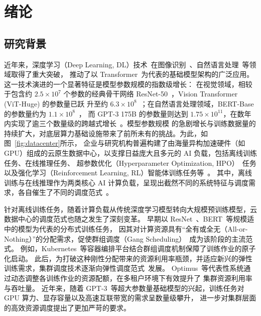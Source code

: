 
\chapter{绪论}

\section{研究背景}

近年来，深度学习（Deep Learning, DL）技术~\cite{lecun2015deep}在图像识别~\cite{krizhevsky2012imagenet,dosovitskiy2020image}、自然语言处理~\cite{sutskever2014sequence,bahdanau2014neural}等领域取得了重大突破，
推动了以 Transformer~\cite{vaswani2017attention}为代表的基础模型架构的广泛应用。
这一技术演进的一个显著特征是模型参数规模的指数级增长：
在视觉领域，相较于包含约 $2.5 \times 10^7$ 个参数的经典骨干网络 ResNet-50~\cite{he2016deep}，Vision Transformer (ViT-Huge) 的参数量已跃
升至约 $6.3 \times 10^8$~\cite{dosovitskiy2020image}；在自然语言处理领域，BERT-Base 的参数量约为 $1.1 \times 10^8$~\cite{devlin2019bert}，
而 GPT-3 175B 的参数量则达到 $1.75 \times 10^{11}$，在数年内实现了逾三个数量级的跨越式增长~\cite{brown2020language}。模型参数规模
的急剧增长与训练数据量的持续扩大，对底层算力基础设施带来了前所未有的挑战。为此，如图~\ref{fig:datacenter}所示，
企业与研究机构普遍构建了由海量异构加速硬件（如 GPU）组成的云原生数据中心，以支撑日益庞大且多元的 AI 负载，包括离线训练任务、在线推理任务、
超参数优化（Hyperparameter Optimization, HPO）~\cite{rasley2017hyperdrive}任务以及强化学习（Reinforcement Learning, RL）智能体训练任务等~\cite{CAICT2024CloudWhitePaperCN}。
其中，离线训练与在线推理作为两类核心 AI 
计算负载，呈现出截然不同的系统特征与调度需求，各自催生了不同的调度范式~\cite{liqirui2022,luolei2021}。

针对离线训练任务，随着计算负载从传统深度学习模型转向大规模预训练模型，云数据中心的调度范式也随之发生了深刻变革。
早期以 ResNet~\cite{he2016deep}、BERT~\cite{devlin2019bert}等规模适中的模型为代表的分布式训练任务，
因其对计算资源具有“全有或全无（All-or-Nothing）”的分配需求，促使群组调度（Gang Scheduling）~\cite{gu2019tiresias,mahajan2020themis}成为该阶段的主流范式。
例如，Kubernetes~\cite{burns2016borg}等容器编排平台结合群组调度机制保障了训练作业的原子化启动。
此后，为打破这种刚性分配带来的资源利用率瓶颈，并适应新兴的弹性训练需求，集群调度技术逐渐向弹性调度范式~\cite{peng2018optimus,qiao2021pollux}发展。
Optimus~\cite{peng2018optimus}等代表性系统通过动态调整各训练作业的资源配额，在多租户环境下有效提升了
集群资源利用率与吞吐量。
近年来，随着 GPT-3~\cite{brown2020language}等超大参数量基础模型的兴起，训练任务对 GPU 算力、显存容量以及高速互联带宽的需求呈数量级攀升，
进一步对集群层面的高效资源调度提出了更加严苛的要求。

